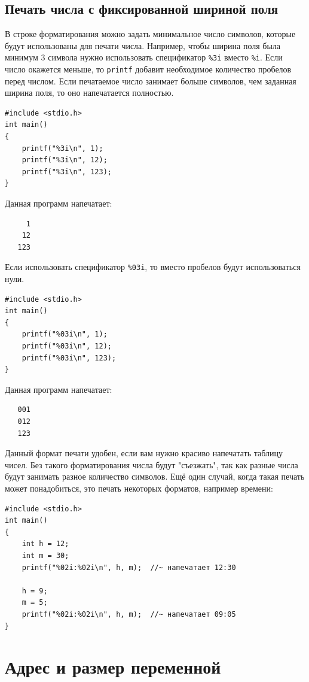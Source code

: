 \documentclass{article}
\begin{document}
\subsection*{Печать числа с фиксированной шириной поля}
В строке форматирования можно задать минимальное число символов, которые будут использованы для печати числа. Например, чтобы ширина поля была минимум 3 символа нужно использовать спецификатор \texttt{\%3i} вместо \texttt{\%i}.
Если число окажется меньше, то \texttt{printf} добавит необходимое количество пробелов перед числом. Если печатаемое число занимает больше символов, чем заданная ширина поля, то оно напечатается полностью.
\begin{lstlisting}
#include <stdio.h>
int main()
{
    printf("%3i\n", 1);
    printf("%3i\n", 12);
    printf("%3i\n", 123);
}
\end{lstlisting}
Данная программ напечатает:
\begin{verbatim}
     1
    12
   123
\end{verbatim}
Если использовать спецификатор \texttt{\%03i}, то вместо пробелов будут использоваться нули.
\begin{lstlisting}
#include <stdio.h>
int main()
{
    printf("%03i\n", 1);
    printf("%03i\n", 12);
    printf("%03i\n", 123);
}
\end{lstlisting}
Данная программ напечатает:
\begin{verbatim}
   001
   012
   123
\end{verbatim}
Данный формат печати удобен, если вам нужно красиво напечатать таблицу чисел. Без такого форматирования числа будут "съезжать"{}, так как разные числа будут занимать разное количество символов. Ещё один случай, когда такая печать может понадобиться, это печать некоторых форматов, например времени:
\begin{lstlisting}
#include <stdio.h>
int main()
{
	int h = 12;
	int m = 30;
	printf("%02i:%02i\n", h, m);  //~ напечатает 12:30
	
	h = 9;
	m = 5;
	printf("%02i:%02i\n", h, m);  //~ напечатает 09:05
}
\end{lstlisting}


\newpage
\section*{Адрес и размер переменной}
\end{document}
